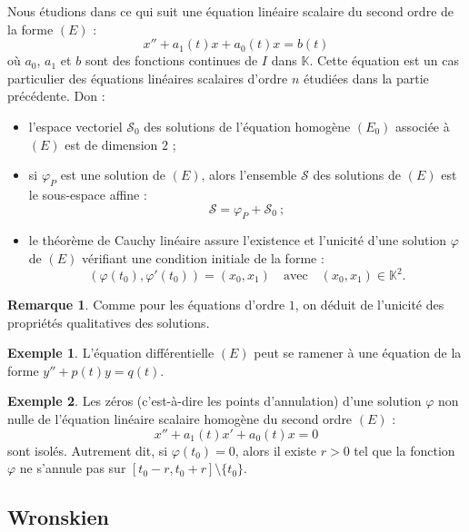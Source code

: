 \documentclass[french]{article}
\newcommand{\K}{\mathbb{K}}
\theoremstyle{plain}
\theoremstyle{definition}
\newtheorem*{ex}{Exemple}
\newtheorem*{rmq}{Remarque}
\theoremstyle{remark}
\begin{document}
Nous étudions dans ce qui suit une équation linéaire scalaire du second ordre de la forme $(E)$ :
$$x''+a_1(t)x+a_0(t)x=b(t)$$
où $a_0$, $a_1$ et $b$ sont des fonctions continues de $I$ dans $\K$. Cette équation est un cas particulier des équations linéaires scalaires d'ordre $n$ étudiées dans la partie précédente. Don :
\begin{itemize}
	\item l'espace vectoriel $\mathcal{S}_0$ des solutions de l'équation homogène $(E_0)$ associée à $(E)$ est de dimension $2$ ;
	\item si $\varphi_P$ est une solution de $(E)$, alors l'ensemble $\mathcal{S}$ des solutions de $(E)$ est le sous-espace affine :
	$$\mathcal{S}=\varphi_P+\mathcal{S}_0\ ;$$
	\item le théorème de Cauchy linéaire assure l'existence et l'unicité d'une solution $\varphi$ de $(E)$ vérifiant une condition initiale de la forme :
	$$(\varphi(t_0),\varphi'(t_0))=(x_0,x_1)\quad\text{avec}\quad(x_0,x_1)\in\K^2.$$
\end{itemize}

\begin{rmq}
	Comme pour les équations d'ordre $1$, on déduit de l'unicité des propriétés qualitatives des solutions.
\end{rmq}

\begin{ex}
	L'équation différentielle $(E)$ peut se ramener à une équation de la forme $y''+p(t)y=q(t)$.
\end{ex}

\begin{ex}
	Les zéros (c'est-à-dire les points d'annulation) d'une solution $\varphi$ non nulle de l'équation linéaire scalaire homogène du second ordre $(E)$ :
	$$x''+a_1(t)x'+a_0(t)x=0$$ sont isolés. Autrement dit, si $\varphi(t_0)=0$, alors il existe $r>0$ tel que la fonction $\varphi$ ne s'annule pas sur $[t_0-r,t_0+r]\setminus\{t_0\}$.
\end{ex}

\subsection{Wronskien}
\end{document}
